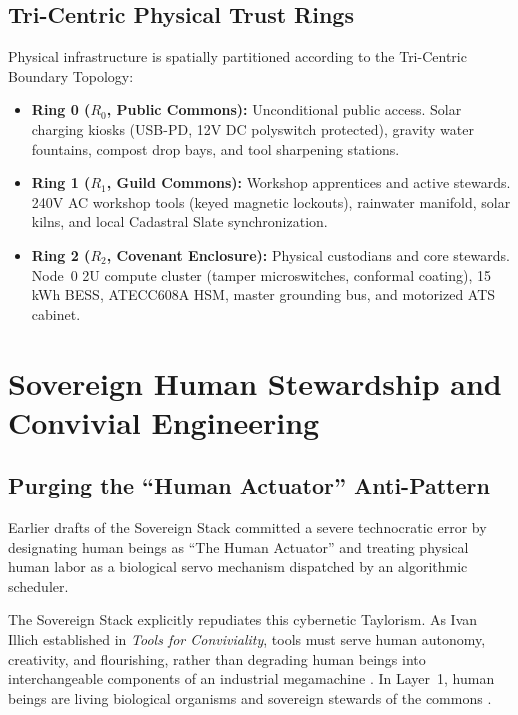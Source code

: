 \subsection{Tri-Centric Physical Trust Rings}

Physical infrastructure is spatially partitioned according to the Tri-Centric Boundary Topology:
\begin{itemize}
    \item \textbf{Ring 0 ($R_0$, Public Commons):} Unconditional public access. Solar charging kiosks (USB-PD, 12V DC polyswitch protected), gravity water fountains, compost drop bays, and tool sharpening stations.
    \item \textbf{Ring 1 ($R_1$, Guild Commons):} Workshop apprentices and active stewards. 240V AC workshop tools (keyed magnetic lockouts), rainwater manifold, solar kilns, and local Cadastral Slate synchronization.
    \item \textbf{Ring 2 ($R_2$, Covenant Enclosure):} Physical custodians and core stewards. Node~0 2U compute cluster (tamper microswitches, conformal coating), 15 kWh BESS, ATECC608A HSM, master grounding bus, and motorized ATS cabinet.
\end{itemize}

\section{Sovereign Human Stewardship and Convivial Engineering}
\label{sec:l1_stewardship}

\subsection{Purging the ``Human Actuator'' Anti-Pattern}

Earlier drafts of the Sovereign Stack committed a severe technocratic error by designating human beings as ``The Human Actuator'' and treating physical human labor as a biological servo mechanism dispatched by an algorithmic scheduler.

The Sovereign Stack explicitly repudiates this cybernetic Taylorism. As Ivan Illich established in \textit{Tools for Conviviality}, tools must serve human autonomy, creativity, and flourishing, rather than degrading human beings into interchangeable components of an industrial megamachine \parencite{illich1973}. In Layer~1, human beings are living biological organisms and sovereign stewards of the commons \parencite{bookchin1982, kropotkin1902}.

